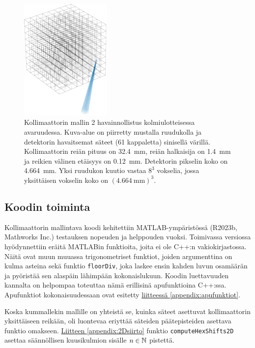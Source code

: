\begin{figure}[H]
    \centering
    \captionsetup{width=.9\textwidth}
    \includegraphics[height=6cm]{kuvat/3d-kollimaattori2.pdf}
    \caption{Kollimaattorin mallin 2 havainnollistus kolmiulotteisessa avaruudessa. Kuva-alue on piirretty mustalla ruudukolla ja detektorin havaitsemat säteet (61 kappaletta) sinisellä värillä. Kollimaattorin reiän pituus on \qty{32.4}{\milli\meter}, reiän halkaisija on \qty{1.4}{\milli\meter} ja reikien välinen etäisyys on \qty{0.12}{\milli\meter}. Detektorin pikselin koko on \qty{4.664}{\milli\meter}. Yksi ruudukon kuutio vastaa $8^3$ vokselia, jossa yksittäisen vokselin koko on $(\qty{4.664}{\milli\meter})^{3}$.}
    \label{fig:ray3}
\end{figure}

\subsection{Koodin toiminta}
Kollimaattorin mallintava koodi kehitettiin MATLAB-ympäristössä (R2023b, Mathworks Inc.) testauksen nopeuden ja helppouden vuoksi. Toimivassa versiossa hyödynnettiin eräitä MATLABin funktioita, joita ei ole C++:n vakiokirjastossa. Näitä ovat muun muuassa trigonometriset funktiot, joiden argumenttina on kulma asteina sekä funktio \texttt{floorDiv}, joka laskee ensin kahden luvun osamäärän ja pyöristää sen alaspäin lähimpään kokonaislukuun. Koodin luettavuuden kannalta on helpompaa toteuttaa nämä erillisinä apufunktioina C++:ssa. Apufunktiot kokonaisuudessaan ovat esitetty \hyperref[appendix:apufunktiot]{liitteessä \ref*{appendix:apufunktiot}}.

Koska kummallekin mallille on yhteistä se, kuinka säteet asettuvat kollimaattorin yksittäiseen reikään, oli luontevaa eriyttää säteiden päätepisteiden asettava funktio omakseen. \hyperref[appendix:2Dsiirto]{Liitteen \ref*{appendix:2Dsiirto}} funktio \texttt{computeHexShifts2D} asettaa säännöllisen kuusikulmion sisälle $n\in\mathbb{N}$ pistettä.

